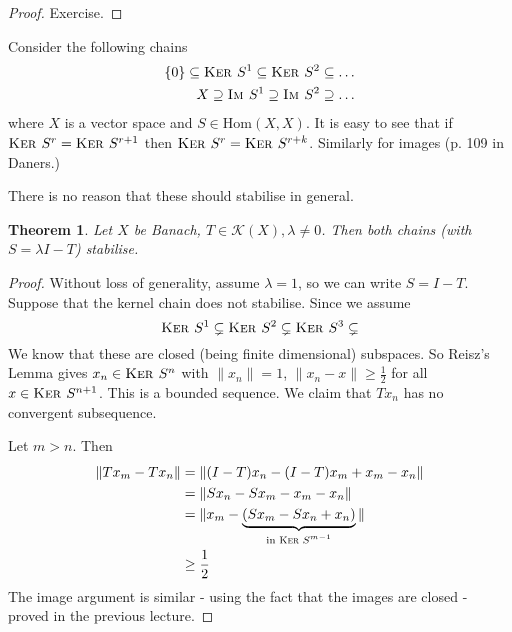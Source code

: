 \documentclass[justified]{tufte-book}
\theoremstyle{plain}%
\newtheorem{thm}{Theorem}[chapter]
\theoremstyle{definition}
\theoremstyle{remark}
\newcommand{\im}{\textsc{Im\ }}
\renewcommand{\ker}{\textsc{Ker\ }}
\begin{document}
\begin{proof}
  Exercise.
\end{proof}

Consider the following chains \begin{align*}
  \{ 0 \} \subseteq \ker S^1 \subseteq \ker S^2 \subseteq \dots \\
  X \supseteq \im S^1 \supseteq \im S^2 \supseteq \dots
\end{align*} where $X$ is a vector space and $S \in \text{Hom}(X, X)$.  It is easy to see that if $\ker S^r = \ker S^{r+1}$ then $\ker S^r = \ker S^{r+k}$.  Similarly for images (p. 109 in Daners.)

There is no reason that these should stabilise in general.
\begin{thm}
  Let $X$ be Banach, $T \in \mathcal K(X), \lambda \neq 0$.  Then both chains (with $S = \lambda I - T$) stabilise.  
\end{thm}
\begin{proof}
   Without loss of generality, assume $\lambda = 1$, so we can write $S = I - T$.  Suppose that the kernel chain does not stabilise.  Since we assume \[
      \ker S^1 \subsetneq \ker S^2 \subsetneq \ker S^3 \subsetneq
   \]  We know that these are closed (being finite dimensional) subspaces.  So Reisz's Lemma gives $x_n \in \ker S^n$ with $\| x_n \| = 1$, $\|x_n - x \| \geq \frac{1}{2}$ for all $x \in \ker S^{n+1}$. This is a bounded sequence.  We claim that $T x_n$ has no convergent subsequence.  
  
  Let $m > n$.  Then \begin{align*}
      \| Tx_m - Tx_n \|   &= \| ( I - T) x_n - (I-T) x_m + x_m - x_n \| \\
                          &= \| Sx_n - Sx_m - x_m - x_n \|\\
                          &= \| x_m - \underbrace{(S x_m  - S x_n  + x_n)}_\text{in $\ker S^{m-1}$} \| \\
                          &\geq \frac{1}{2}
  \end{align*}  The image argument is similar - using the fact that the images are closed - proved in the previous lecture.
\end{proof}
\end{document}
